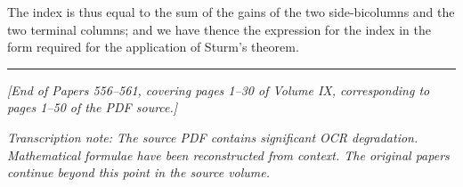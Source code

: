 \documentclass[12pt,a4paper]{article}
\theoremstyle{plain}
\theoremstyle{definition}
\begin{document}
The index is thus equal to the sum of the gains of the two side-bicolumns and the two terminal columns; and we have thence the expression for the index in the form required for the application of Sturm's theorem.

\vspace{20pt}

\begin{center}
\rule{0.5\textwidth}{0.4pt}
\end{center}

\vspace{12pt}

\noindent\textit{[End of Papers 556--561, covering pages 1--30 of Volume IX, corresponding to pages 1--50 of the PDF source.]}

\vspace{12pt}

\noindent\textit{Transcription note: The source PDF contains significant OCR degradation. Mathematical formulae have been reconstructed from context. The original papers continue beyond this point in the source volume.}
\end{document}
